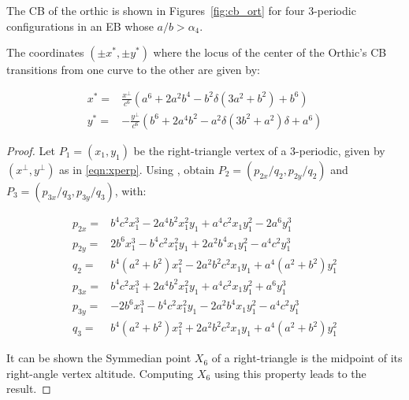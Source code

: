 The CB of the orthic is shown in Figures~\ref{fig:cb_ort} for four 3-periodic configurations in an EB whose $a/b>\alpha_4$.

\begin{proposition}

The coordinates $({\pm}x^*,{\pm}y^*)$ where the locus of the center of the Orthic's CB transitions from one curve to the other are given by:

\begin{align*}
x^*=&\frac{x^{\perp}}{c^6}\left(a^6+2 a^2 b^4- b^2 \delta(3 a^2  +b^2)    +b^6\right)\\
y^* =&-\frac{y^{\perp}}{c^6}\left(b^6+2 a^4 b^2 -  a^2 \delta (3 b^2 +a^2)   \delta+a^6\right)
\end{align*}

\end{proposition}

\begin{proof}
Let $P_1=(x_1,y_1)$ be the right-triangle vertex of a 3-periodic, given by $(x^\perp,y^\perp)$ as in \eqref{eqn:xperp}. Using \cite{garcia2019-incenter}, obtain $P_2=(p_{2x}/q_2, p_{2y}/q_2)$ and $P_3=(p_{3x}/q_3, p_{3y}/q_3)$, with:
 
 \begin{align*}
     p_{2x}= &b^4 c^2 x_1^3 -2 a^4 b^2 x_1^2 y_1+a^4 c^2 x_1 y_1^2-2 a^6 y_1^3\\
     p_{2y}=&2 b^6 x_1^3-b^4 c^2  x_1^2 y_1+2 a^2 b^4x_1 y_1^2-a^4 c^2 y_1^3\\
     q_2=&b^4 (a^2+b^2) x_1^2-2 a^2 b^2c^2 x_1 y_1 +a^4 (a^2+b^2) y_1^2\\
     p_{3x}=& b^4 c^2 x_1^3  +2 a^4 b^2 x_1^2 y_1+a^4 c^2 x_1 y_1^2+a^6 y_1^3\\
     p_{3y}=&-2 b^6 x_1^3 -b^4 c^2 x_1^2 y_1-2 a^2 b^4 x_1 y_1^2-a^4 c^2 y_1^3 \\
     q_3=&b^4 (a^2+b^2) x_1^2+2 a^2 b^2c^2 x_1 y_1+a^4 (a^2+b^2) y_1^2
 \end{align*}


It can be shown the Symmedian point $X_6$ of a right-triangle is the midpoint of its right-angle vertex altitude. Computing $X_6$ using this property leads to the result.
\end{proof}

